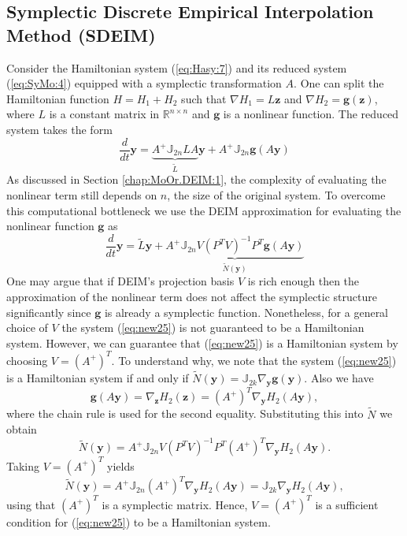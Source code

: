 \subsection{Symplectic Discrete Empirical Interpolation Method (SDEIM)} Consider the Hamiltonian system (\ref{eq:Hasy:7}) and its reduced system (\ref{eq:SyMo:4}) equipped with a symplectic transformation $A$. One can split the Hamiltonian function $H = H_1 + H_2$ such that $\nabla H_1 = L\mathbf z$ and $\nabla H_2 = \mathbf g(\mathbf z)$, where $L$ is a constant matrix in $\mathbb R^{n\times n}$ and $\mathbf g$ is a nonlinear function. The reduced system takes the form
\begin{equation} \label{eq:new24}
	\frac{d}{dt} \mathbf y = \underbrace{A^+ \mathbb J_{2n} L A}_{\tilde L} \mathbf y + A^+ \mathbb J_{2n} \mathbf g(A\mathbf y)
\end{equation}
As discussed in Section \ref{chap:MoOr.DEIM:1}, the complexity of evaluating the nonlinear term still depends on $n$, the size of the original system. To overcome this computational bottleneck we use the DEIM approximation for evaluating the nonlinear function $\mathbf g$ as
\begin{equation} \label{eq:new25}
	\frac{d}{dt} \mathbf y = \tilde L \mathbf y + \underbrace{ A^+ \mathbb J_{2n} V (P^TV)^{-1} P^T \mathbf g(A\mathbf y) }_{\tilde N(\mathbf y)}
\end{equation}
One may argue that if DEIM's projection basis $V$ is rich enough then the approximation of the nonlinear term does not affect the symplectic structure significantly since $\mathbf g$ is already a symplectic function. Nonetheless, for a general choice of $V$ the system (\ref{eq:new25}) is not guaranteed to be a Hamiltonian system. However, we can guarantee that (\ref{eq:new25}) is a Hamiltonian system by choosing $V=(A^+)^T$. To understand why, we note that the system (\ref{eq:new25}) is a Hamiltonian system if and only if $\tilde N(\mathbf y) = \mathbb J_{2k} \nabla_{\mathbf y} \mathbf g(\mathbf y)$. Also we have 
\begin{equation} \label{eq:new26}
	\mathbf g(A\mathbf y) = \nabla_{\mathbf z} H_2(\mathbf z) = (A^+)^T \nabla_{\mathbf y} H_2(A \mathbf y),
\end{equation}
where the chain rule is used for the second equality. Substituting this into $\tilde N$ we obtain
\begin{equation} \label{eq:new27}
	\tilde N(\mathbf y)= A^+ \mathbb J_{2n} V (P^TV)^{-1} P^T  (A^+)^T \nabla_{\mathbf y} H_2(A \mathbf y).
\end{equation}
Taking $V = (A^+)^T$ yields
\begin{equation} \label{eq:new28}
	\tilde N(\mathbf y) = A^+ \mathbb J_{2n}(A^+)^T \nabla_{\mathbf y} H_2(A \mathbf y) = \mathbb J_{2k} \nabla_{\mathbf y} H_2(A \mathbf y),
\end{equation}
using that $(A^+)^T$ is a symplectic matrix. Hence, $V = (A^+)^T$ is a sufficient condition for (\ref{eq:new25}) to be a Hamiltonian system. 

